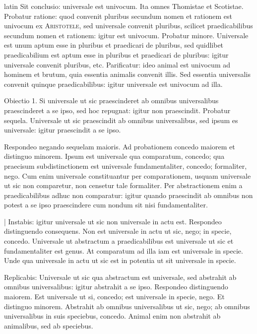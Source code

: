 \begin{otherlanguage*}{latin}
\pstart
  Sit conclusio: universale est univocum. Ita omnes Thomistae et Scotistae. Probatur ratione: quod convenit pluribus secundum nomen et rationem est univocum ex \textsc{Aristotele}, sed universale convenit pluribus, scilicet praedicabilibus secundum nomen et rationem: igitur est univocum. Probatur minore. Universale est unum aptum esse in pluribus et praedicari de pluribus, sed quidlibet praedicabilium est aptum esse in pluribus et praedicari de pluribus: igitur universale convenit pluribus, etc. Parificatur: ideo animal est univocum ad hominem et brutum, quia essentia animalis convenit illis. Sed essentia universalis convenit quinque praedicabilibus: igitur universale est univocum ad illa. 
\pend

\pstart
  Obiectio 1. Si universale ut sic praescinderet ab omnibus universalibus praescinderet a se ipso, sed hoc repugnat: igitur non praescindit. Probatur sequela. Universale ut sic praescindit ab omnibus universalibus, sed ipsum es universale: igitur praescindit a se ipso. 
\pend

\pstart
  Respondeo negando sequelam maioris. Ad probationem concedo maiorem et distinguo minorem. Ipsum est universale qua comparatum, concedo; qua praecisum subdistinctionem est universale fundamentaliter, concedo; formaliter, nego. Cum enim universale constituantur per comparationem, usquam universale ut sic non comparetur, non censetur tale formaliter. Per abstractionem enim a praedicabilibus adhuc non comparatur: igitur quando praescindit ab omnibus non potest a se ipso praescindere cum nondum sit nisi fundamentaliter. 
\pend

\pstart
  \textnormal{|}   Instabis: igitur universale ut sic non universale in actu est. Respondeo distinguendo consequens. Non est universale in actu ut sic, nego; in specie, concedo. Universale ut abstractum a praedicabilibus est universale ut sic et fundamentaliter est genus. At comparatum ad illa iam est universale in specie. Unde qua universale in actu ut sic est in potentia ut sit universale in specie. 
\pend

\pstart
  Replicabis: Universale ut sic qua abstractum est universale, sed abstrahit ab omnibus universalibus: igitur abstrahit a se ipso. Respondeo distinguendo maiorem. Est universale ut si, concedo; est universale in specie, nego. Et distinguo minorem. Abstrahit ab omnibus universalibus ut sic, nego; ab omnibus universalibus in suis speciebus, concedo. Animal enim non abstrahit ab animalibus, sed ab speciebus. 
\pend


\end{otherlanguage*}
